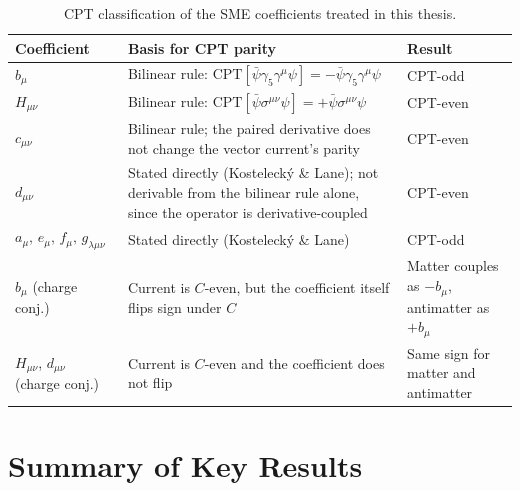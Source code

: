 \documentclass[main]{subfiles}
\begin{document}
\begin{table}[h]
\centering
\small
\begin{tabular}{@{}l>{\raggedright\arraybackslash}p{7cm}l@{}}
\toprule
Coefficient & Basis for CPT parity & Result \\
\midrule
$b_\mu$ & Bilinear rule: $\mathrm{CPT}[\bar\psi\gamma_5\gamma^\mu\psi]=-\bar\psi\gamma_5\gamma^\mu\psi$ & CPT-odd \\
$H_{\mu\nu}$ & Bilinear rule: $\mathrm{CPT}[\bar\psi\sigma^{\mu\nu}\psi]=+\bar\psi\sigma^{\mu\nu}\psi$ & CPT-even \\
$c_{\mu\nu}$ & Bilinear rule; the paired derivative does not change the vector current's parity & CPT-even \\
$d_{\mu\nu}$ & Stated directly (Kostelecký \& Lane); not derivable from the bilinear rule alone, since the operator is derivative-coupled & CPT-even \\
$a_\mu,\,e_\mu,\,f_\mu,\,g_{\lambda\mu\nu}$ & Stated directly (Kostelecký \& Lane) & CPT-odd \\
$b_\mu$ (charge conj.) & Current is $C$-even, but the coefficient itself flips sign under $C$ & Matter couples as $-b_\mu$, antimatter as $+b_\mu$ \\
$H_{\mu\nu}$, $d_{\mu\nu}$ (charge conj.) & Current is $C$-even and the coefficient does not flip & Same sign for matter and antimatter \\
\bottomrule
\end{tabular}
\caption{CPT classification of the SME coefficients treated in this thesis.}
\label{tab:app-cpt}
\end{table}

\section{Summary of Key Results}
\end{document}
